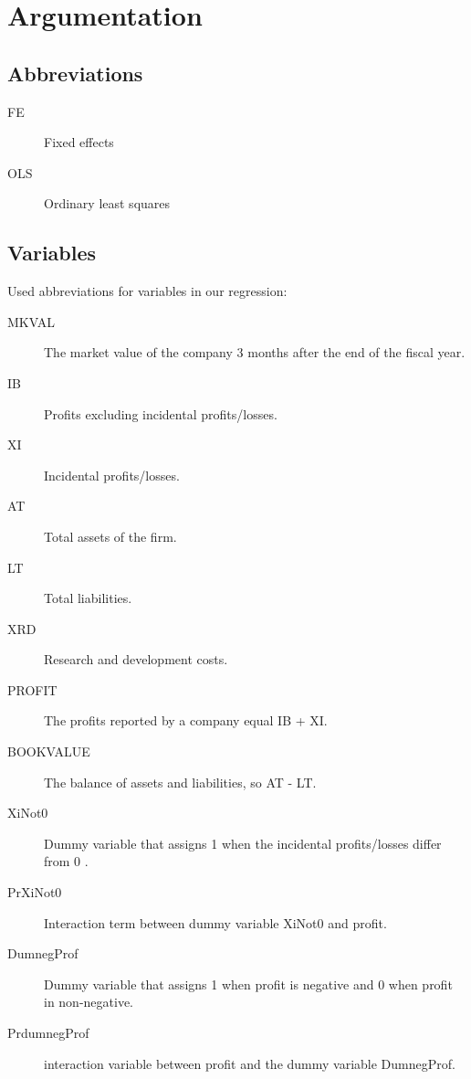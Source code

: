\documentclass[11pt, letterpaper]{article}
\begin{document}
\newpage
\section{Argumentation}
\subsection{Abbreviations}
\begin{description}
\item[FE] Fixed effects
\item[OLS] Ordinary least squares
\end{description}

 \subsection{Variables}
Used abbreviations for variables in our regression:
\begin{description}
 \item[MKVAL] The market value of the company 3 months after the end of the fiscal year.
 \item[IB] Profits excluding incidental profits/losses.
 \item[XI] Incidental profits/losses.
 \item[AT] Total assets of the firm.
 \item[LT] Total liabilities.
 \item[XRD] Research and development costs.
 \item[PROFIT] The profits reported by a company equal IB + XI.
 \item[BOOK\textunderscore VALUE] The balance of assets and liabilities, so AT - LT.
 \item[XiNot0] Dummy variable that assigns 1 when the incidental profits/losses differ from 0 .
 \item[PrXiNot0] Interaction term between dummy variable XiNot0 and profit.
 \item[Dum\textunderscore neg\textunderscore Prof] Dummy variable that assigns 1 when profit is negative and 0 when profit in non-negative.
 \item[Prdum\textunderscore neg\textunderscore Prof] interaction variable between profit and the dummy variable  Dum\textunderscore neg\textunderscore Prof.
\end{description}
\end{document}
